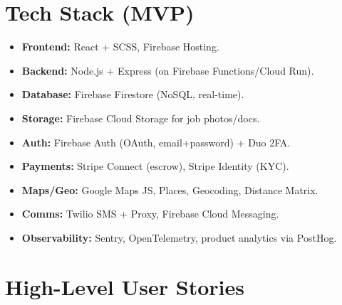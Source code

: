 \documentclass[11pt]{article}
\begin{document}
\section{Tech Stack (MVP)}
\begin{itemize}[leftmargin=1.4em]
  \item \textbf{Frontend:} React + SCSS, Firebase Hosting.
  \item \textbf{Backend:} Node.js + Express (on Firebase Functions/Cloud Run).
  \item \textbf{Database:} Firebase Firestore (NoSQL, real-time).
  \item \textbf{Storage:} Firebase Cloud Storage for job photos/docs.
  \item \textbf{Auth:} Firebase Auth (OAuth, email+password) + Duo 2FA.
  \item \textbf{Payments:} Stripe Connect (escrow), Stripe Identity (KYC).
  \item \textbf{Maps/Geo:} Google Maps JS, Places, Geocoding, Distance Matrix.
  \item \textbf{Comms:} Twilio SMS + Proxy, Firebase Cloud Messaging.
  \item \textbf{Observability:} Sentry, OpenTelemetry, product analytics via PostHog.
\end{itemize}

\section{High-Level User Stories}
\end{document}
